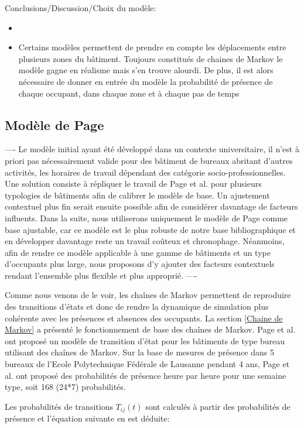 Conclusions/Discussion/Choix du modèle:
\begin{itemize}
\item
\item Certains modèles permettent de prendre en compte les déplacements entre plusieurs zones du bâtiment. Toujours constitués de chaines de Markov le modèle gagne en réalisme mais s'en trouve alourdi. De plus, il est alors nécessaire de donner en entrée du modèle la probabilité de présence de chaque occupant, dans chaque zone et à chaque pas de temps
\end{itemize}

\subsection{Modèle de Page}

----
Le modèle initial ayant été développé dans un contexte universitaire, il n'est à priori pas nécessairement valide pour des bâtiment de bureaux abritant d'autres activités, les horaires de travail dépendant des catégorie socio-professionnelles. Une solution consiste à répliquer le travail de Page et al. \cite{Page-08} pour plusieurs typologies de bâtiments afin de calibrer le modèle de base. Un ajustement contextuel plus fin serait ensuite possible afin de considérer davantage de facteurs influents. Dans la suite, nous utiliserons uniquement le modèle de Page comme base ajustable, car ce modèle est le plus robuste de notre base bibliographique et en développer davantage reste un travail coûteux et chronophage. Néanmoins, afin de rendre ce modèle applicable à une gamme de bâtiments et un type d'occupants plus large, nous proposons d'y ajouter des facteurs contextuels rendant l'ensemble plus flexible et plus approprié.
----


Comme nous venons de le voir, les chaînes de Markov permettent de reproduire des transitions d'états et donc de rendre la dynamique de simulation plus cohérente avec les présences et absences des occupants. La section \ref{Chaine de Markov} a présenté le fonctionnement de base des chaînes de Markov. Page et al. \cite{Page-08} ont proposé un modèle de transition d'état pour les bâtiments de type bureau utilisant des chaînes de Markov. Sur la base de mesures de présence dans 5 bureaux de l'Ecole Polytechnique Fédérale de Lausanne pendant 4 ans, Page et al. ont proposé des probabilités de présence heure par heure pour une semaine type, soit 168 (24*7) probabilités. 

Les probabilités de transitions $T_{ij}(t)$ sont calculés à partir des probabilités de présence et l'équation suivante en est déduite:

